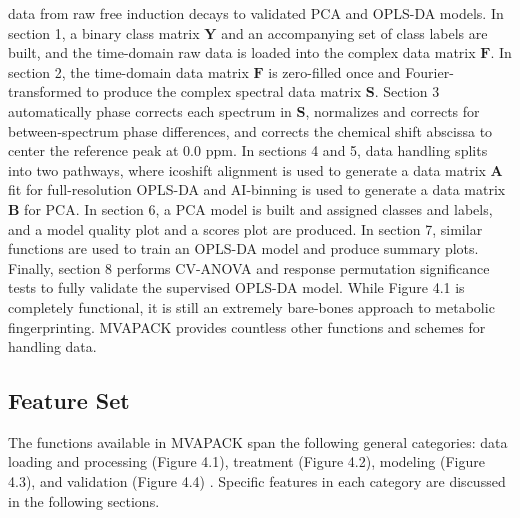 \begin{doublespace}
data from raw free induction decays to validated PCA and OPLS-DA models. In
section 1, a binary class matrix $\mathbf{Y}$ and an accompanying set of class
labels are built, and the time-domain raw data is loaded into the complex data
matrix $\mathbf{F}$. In section 2, the time-domain data matrix $\mathbf{F}$ is
zero-filled once and Fourier-transformed to produce the complex spectral data
matrix $\mathbf{S}$. Section 3 automatically phase corrects each spectrum in
$\mathbf{S}$, normalizes and corrects for between-spectrum phase differences,
and corrects the chemical shift abscissa to center the reference peak at $0.0$
ppm. In sections 4 and 5, data handling splits into two pathways, where
icoshift alignment \cite{savorani:jmr2010} is used to generate a data matrix
$\mathbf{A}$ fit for full-resolution OPLS-DA and AI-binning
\cite{demeyer:anchem2008} is used to generate a data matrix $\mathbf{B}$ for
PCA. In section 6, a PCA model is built and assigned classes and labels, and
a model quality plot and a scores plot are produced. In section 7, similar
functions are used to train an OPLS-DA model and produce summary plots.
Finally, section 8 performs CV-ANOVA \cite{eriksson:jchemo2008} and response
permutation \cite{westerhuis:metab2008} significance tests to fully validate
the supervised OPLS-DA model. While Figure 4.1 is completely functional, it is
still an extremely bare-bones approach to metabolic fingerprinting. MVAPACK
provides countless other functions and schemes for handling data.
\end{doublespace}

\subsection{Feature Set}

\begin{doublespace}
The functions available in MVAPACK span the following general categories:
data loading and processing (Figure 4.1), treatment (Figure 4.2),
modeling (Figure 4.3), and validation (Figure 4.4) \cite{goodacre:metab2007}.
Specific features in each category are discussed in the following sections.
\end{doublespace}

